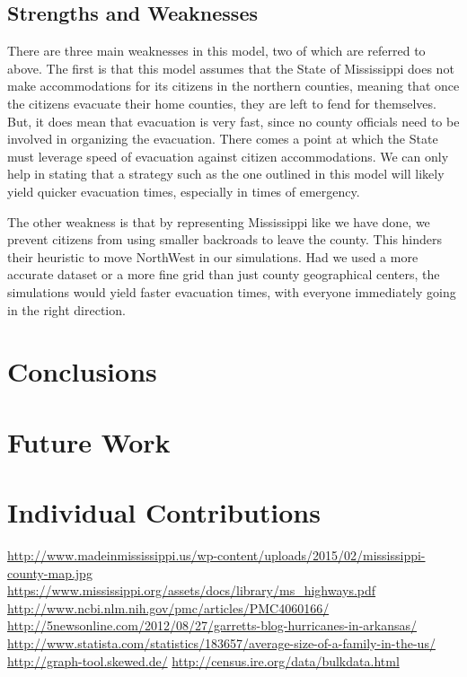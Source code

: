 \documentclass[titlepage]{article}
\begin{document}
  \subsection{Strengths and Weaknesses}
    \par There are three main weaknesses in this model, two of which are referred to above. The first is that this model assumes that the State of Mississippi does not make accommodations for its citizens in the northern counties, meaning that once the citizens evacuate their home counties, they are left to fend for themselves. But, it does mean that evacuation is very fast, since no county officials need to be involved in organizing the evacuation. There comes a point at which the State must leverage speed of evacuation against citizen accommodations. We can only help in stating that a strategy such as the one outlined in this model will likely yield quicker evacuation times, especially in times of emergency.
    \par The other weakness is that by representing Mississippi like we have done, we prevent citizens from using smaller backroads to leave the county. This hinders their heuristic to move NorthWest in our simulations. Had we used a more accurate dataset or a more fine grid than just county geographical centers, the simulations would yield faster evacuation times, with everyone immediately going in the right direction.

\section{Conclusions}
\label{sec:conclusions}

\section{Future Work}
\label{sec:future}

\section{Individual Contributions}
\label{sec:contributions}
  \begin{thebibliography}{9}
      \url{http://www.madeinmississippi.us/wp-content/uploads/2015/02/mississippi-county-map.jpg}
      \url{https://www.mississippi.org/assets/docs/library/ms_highways.pdf}
      \url{http://www.ncbi.nlm.nih.gov/pmc/articles/PMC4060166/}
      \url{http://5newsonline.com/2012/08/27/garretts-blog-hurricanes-in-arkansas/}
      \url{http://www.statista.com/statistics/183657/average-size-of-a-family-in-the-us/}
      \url{http://graph-tool.skewed.de/}
      \url{http://census.ire.org/data/bulkdata.html}
  \end{thebibliography}
\end{document}
